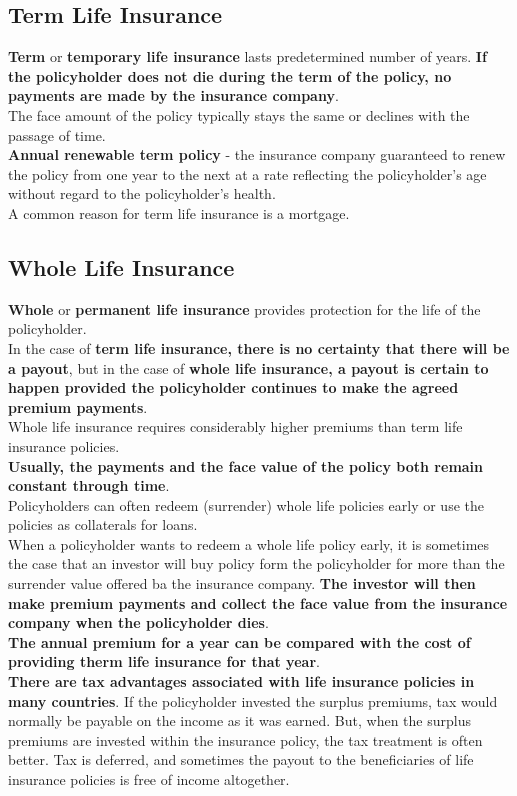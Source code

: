 \subsection{Term Life Insurance}
\textbf{\color{blue}Term} or \textbf{\color{blue}temporary life insurance} lasts predetermined number of years. \textbf{\color{ForestGreen}If the policyholder does not die during the term of the policy, no payments are made by the insurance company}.\\
The face amount of the policy typically stays the same or declines with the passage of time.\\
\textbf{\color{blue}Annual renewable term policy} - the insurance company guaranteed to renew the policy from one year to the next at a rate reflecting the policyholder's age without regard to the policyholder's health.\\
A common reason for term life insurance is a mortgage.

\subsection{Whole Life Insurance}
\textbf{\color{blue}Whole} or \textbf{\color{blue}permanent life insurance} provides protection for the life of the policyholder.\\
In the case of \textbf{\color{ForestGreen}term life insurance, there is no certainty that there will be a payout}, but in the case of \textbf{\color{Mahogany}whole life insurance, a payout is certain to happen provided the policyholder continues to make the agreed premium payments}.\\
Whole life insurance requires considerably higher premiums than term life insurance policies.\\
\textbf{\color{blue}Usually, the payments and the face value of the policy both remain constant through time}.\\
Policyholders can often redeem (surrender) whole life policies early or use the policies as collaterals for loans.\\
When a policyholder wants to redeem a whole life policy early, it is sometimes the case that an investor will buy policy form the policyholder for more than the surrender value offered ba the insurance company. \textbf{\color{blue}The investor will then make premium payments and collect the face value from the insurance company when the policyholder dies}.\\
\textbf{\color{Mahogany}The annual premium for a year can be compared with the cost of providing therm life insurance for that year}.\\
\textbf{\color{blue}There are tax advantages associated with life insurance policies in many countries}. If the policyholder invested the surplus premiums, tax would normally be payable on the income as it was earned. But, when the surplus premiums are invested within the insurance policy, the tax treatment is often better. Tax is deferred, and sometimes the payout to the beneficiaries of life insurance policies is free of income altogether.

